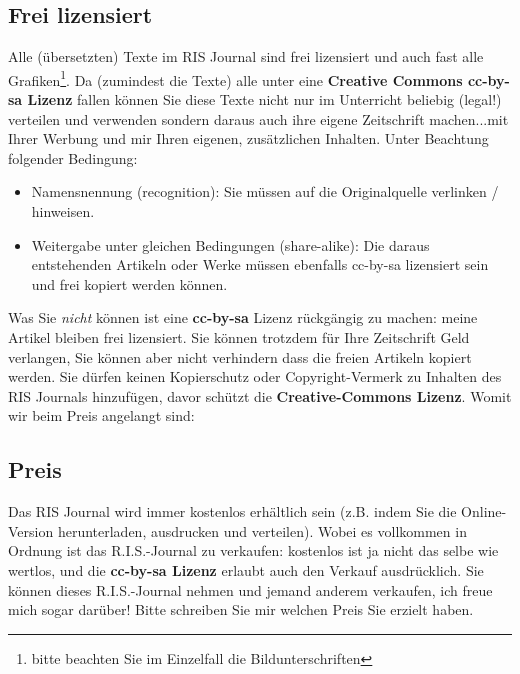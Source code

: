 \subsection*{Frei lizensiert}
Alle (übersetzten) Texte im RIS Journal sind frei lizensiert und auch fast alle Grafiken\footnote{bitte beachten Sie im Einzelfall die Bildunterschriften}. Da (zumindest die Texte) alle unter eine \textbf{Creative Commons cc-by-sa Lizenz} fallen können Sie diese Texte nicht nur im Unterricht beliebig (legal!) verteilen und verwenden sondern daraus auch ihre eigene Zeitschrift machen...mit Ihrer Werbung und mir Ihren eigenen, zusätzlichen Inhalten. Unter Beachtung folgender Bedingung:
\begin{itemize} 
\item Namensnennung (recognition): Sie müssen auf die Originalquelle verlinken / hinweisen. 
\item Weitergabe unter gleichen Bedingungen (share-alike): Die daraus entstehenden Artikeln oder Werke müssen ebenfalls cc-by-sa lizensiert sein und frei kopiert werden können.
\end{itemize}
Was Sie \emph{nicht} können ist eine \textbf{cc-by-sa} Lizenz rückgängig zu machen: meine Artikel bleiben frei lizensiert. Sie können trotzdem für Ihre Zeitschrift Geld verlangen, Sie können aber nicht verhindern dass die freien Artikeln kopiert werden. Sie dürfen keinen  Kopierschutz oder Copyright-Vermerk zu Inhalten des RIS Journals hinzufügen, davor schützt die \textbf{Creative-Commons Lizenz}. Womit wir beim Preis angelangt sind:

\subsection*{Preis}
Das RIS Journal wird immer kostenlos erhältlich sein (z.B. indem Sie die Online-Version herunterladen, ausdrucken und verteilen). Wobei es vollkommen in Ordnung ist das R.I.S.-Journal zu verkaufen: kostenlos ist ja nicht das selbe wie wertlos, und die \textbf{cc-by-sa Lizenz} erlaubt auch den Verkauf ausdrücklich. Sie können dieses R.I.S.-Journal nehmen und jemand anderem verkaufen, ich freue mich sogar darüber! Bitte schreiben Sie mir welchen Preis Sie erzielt haben. 

